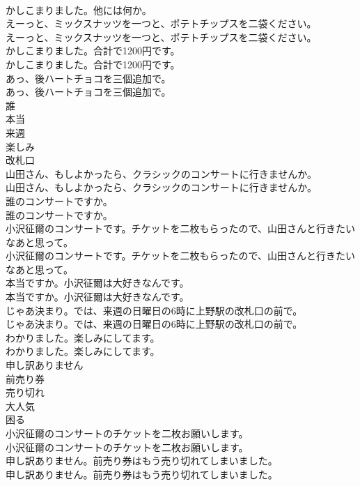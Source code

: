 \documentclass[8pt]{extreport}
\begin{document}
\begin{CJK}{UTF8}{min}
\\	かしこまりました。他には何か。 
\\	えーっと、ミックスナッツを一つと、ポテトチップスを二袋ください。	
\\	えーっと、ミックスナッツを一つと、ポテトチップスを二袋ください。 
\\	かしこまりました。合計で1200円です。	
\\	かしこまりました。合計で1200円です。 
\\	あっ、後ハートチョコを三個追加で。	
\\	あっ、後ハートチョコを三個追加で。 
\\	誰
\\	本当
\\	来週
\\	楽しみ
\\	改札口
\\	山田さん、もしよかったら、クラシックのコンサートに行きませんか。	
\\	山田さん、もしよかったら、クラシックのコンサートに行きませんか。 
\\	誰のコンサートですか。	
\\	誰のコンサートですか。 
\\	小沢征爾のコンサートです。チケットを二枚もらったので、山田さんと行きたいなあと思って。	
\\	小沢征爾のコンサートです。チケットを二枚もらったので、山田さんと行きたいなあと思って。 
\\	本当ですか。小沢征爾は大好きなんです。	
\\	本当ですか。小沢征爾は大好きなんです。 
\\	じゃあ決まり。では、来週の日曜日の6時に上野駅の改札口の前で。	
\\	じゃあ決まり。では、来週の日曜日の6時に上野駅の改札口の前で。 
\\	わかりました。楽しみにしてます。	
\\	わかりました。楽しみにしてます。 
\\	申し訳ありません
\\	前売り券
\\	売り切れ
\\	大人気
\\	困る
\\	小沢征爾のコンサートのチケットを二枚お願いします。	
\\	小沢征爾のコンサートのチケットを二枚お願いします。 
\\	申し訳ありません。前売り券はもう売り切れてしまいました。	
\\	申し訳ありません。前売り券はもう売り切れてしまいました。 

\end{CJK}
\end{document}
